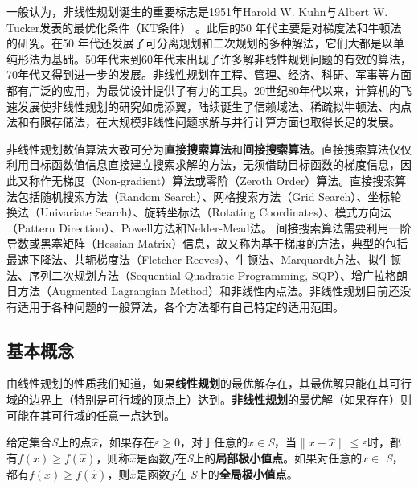 一般认为，非线性规划诞生的重要标志是1951年Harold W. Kuhn与Albert W. Tucker发表的最优化条件（KT条件）
\cite{karush1939minima,kuhn1951nonlinear}。此后的50 年代主要是对梯度法和牛顿法的研究。在50 年代还发展了可分离规划和二次规划的多种解法，它们大都是以单纯形法为基础。50年代末到60年代末出现了许多解非线性规划问题的有效的算法，70年代又得到进一步的发展。非线性规划在工程、管理、经济、科研、军事等方面都有广泛的应用，为最优设计提供了有力的工具。20世纪80年代以来，计算机的飞速发展使非线性规划的研究如虎添翼，陆续诞生了信赖域法、稀疏拟牛顿法、内点法和有限存储法，在大规模非线性问题求解与并行计算方面也取得长足的发展。

非线性规划数值算法大致可分为\textbf{直接搜索算法}和\textbf{间接搜索算法}。直接搜索算法仅仅利用目标函数值信息直接建立搜索求解的方法，无须借助目标函数的梯度信息，因此又称作无梯度（Non-gradient）算法或零阶（Zeroth Order）算法。直接搜索算法包括随机搜索方法（Random Search）、网格搜索方法（Grid Search）、坐标轮换法（Univariate Search）\cite{desopo1959convex}、旋转坐标法（Rotating Coordinates）\cite{rosenbrock1960automatic}、模式方向法（Pattern Direction）\cite{hooke1961direct}、Powell方法\cite{powell1964efficient}和Nelder-Mead法\cite{nelder1965simplex}。
间接搜索算法需要利用一阶导数或黑塞矩阵（Hessian Matrix）信息，故又称为基于梯度的方法，典型的包括最速下降法、共轭梯度法（Fletcher-Reeves）、牛顿法、Marquardt方法、拟牛顿法、序列二次规划方法（Sequential Quadratic Programming, SQP）、增广拉格朗日方法（Augmented Lagrangian Method）和非线性内点法。非线性规划目前还没有适用于各种问题的一般算法，各个方法都有自己特定的适用范围。


\subsection{基本概念}
由线性规划的性质我们知道，如果\textbf{线性规划}的最优解存在，其最优解只能在其可行域的边界上（特别是可行域的顶点上）达到。\textbf{非线性规划}的最优解（如果存在）则可能在其可行域的任意一点达到。

\begin{definition}[极小值点]
给定集合\textit{S}上的点$\hat x$，如果存在$\varepsilon \ge 0$，对于任意的$x\in $\textit{S}，当$\|x-\hat x\| \le \varepsilon$时，都有$f(x) \ge f(\hat x)$，则称$\hat x$是函数$f$在\textit{S}上的\textbf{局部极小值点}。如果对任意的$x \in$ \textit{S}，都有$f(x) \ge f(\hat x)$，则$\hat x$是函数$f$在
\textit{S}上的\textbf{全局极小值点}。
\end{definition}

